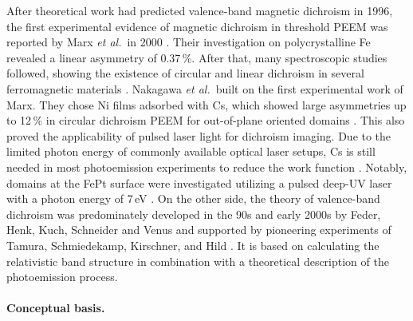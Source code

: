 \documentclass[prl,twocolumn,floatfix]{revtex4-2}
\begin{document}
 After theoretical work had predicted valence-band magnetic dichroism in 1996, the first experimental evidence of magnetic dichroism in threshold PEEM was reported by Marx \textit{et al.}\ in 2000 \cite{henk1996,feder1996, marx2000}. Their investigation on polycrystalline Fe revealed a linear asymmetry of 0.37\,\%. After that, many spectroscopic studies followed, showing the existence of circular and linear dichroism in several ferromagnetic materials \cite{nakagawa2006,hild2008,hild2009,hild2010,hild2012}. Nakagawa \textit{et al.}\ built on the first experimental work of Marx. They chose Ni films adsorbed with Cs, which showed large asymmetries up to 12\,\% in circular dichroism PEEM for out-of-plane oriented domains \cite{nakagawa2007,nakagawa2009,nakagawa2012}. This also proved the applicability of pulsed laser light for dichroism imaging. Due to the limited photon energy of commonly available optical laser setups, Cs is still needed in most photoemission experiments to reduce the work function \cite{kronseder2011, meier2017}. Notably, domains at the FePt surface were investigated utilizing a pulsed deep-UV laser with a photon energy of 7\,eV \cite{zhao2019}. 
On the other side, the theory of valence-band dichroism was predominately developed in the 90s and early 2000s by Feder, Henk, Kuch, Schneider and Venus \cite{feder1996,henk1996,kuch1996a,kuch2001,venus1994,venus1997} and supported by pioneering experiments of Tamura, Schmiedekamp, Kirschner, and Hild \cite{tamura1987, schmiedeskamp1988, venus95, hild2008, hild2009, hild2010}. It is based on calculating the relativistic band structure in combination with a theoretical description of the photoemission process.



\paragraph{Conceptual basis.} 
\end{document}

